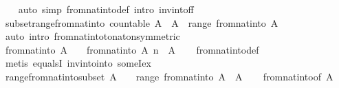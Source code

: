 \begin{isabellebody}
%
\isadelimproof
\ \ %
\endisadelimproof
%
\isatagproof
{}\isamarkupfalse%
\ {\isacharparenleft}auto\ simp{\isacharcolon}\ from{\isacharunderscore}nat{\isacharunderscore}into{\isacharunderscore}def\ intro{\isacharbang}{\isacharcolon}\ inv{\isacharunderscore}into{\isacharunderscore}f{\isacharunderscore}f{\isacharparenright}%
\endisatagproof
{\isafoldproof}%
%
\isadelimproof
\isanewline
%
\endisadelimproof
\isanewline
{}\isamarkupfalse%
\ subset{\isacharunderscore}range{\isacharunderscore}from{\isacharunderscore}nat{\isacharunderscore}into{\isacharcolon}\ {\isachardoublequoteopen}countable\ A\ {\isasymLongrightarrow}\ A\ {\isasymsubseteq}\ range\ {\isacharparenleft}from{\isacharunderscore}nat{\isacharunderscore}into\ A{\isacharparenright}{\isachardoublequoteclose}\isanewline
%
\isadelimproof
\ \ %
\endisadelimproof
%
\isatagproof
{}\isamarkupfalse%
\ {\isacharparenleft}auto\ intro{\isacharcolon}\ from{\isacharunderscore}nat{\isacharunderscore}into{\isacharunderscore}to{\isacharunderscore}nat{\isacharunderscore}on{\isacharbrackleft}symmetric{\isacharbrackright}{\isacharparenright}%
\endisatagproof
{\isafoldproof}%
%
\isadelimproof
\isanewline
%
\endisadelimproof
\isanewline
{}\isamarkupfalse%
\ from{\isacharunderscore}nat{\isacharunderscore}into{\isacharcolon}\ {\isachardoublequoteopen}A\ {\isasymnoteq}\ {\isacharbraceleft}{\isacharbraceright}\ {\isasymLongrightarrow}\ from{\isacharunderscore}nat{\isacharunderscore}into\ A\ n\ {\isasymin}\ A{\isachardoublequoteclose}\isanewline
%
\isadelimproof
\ \ %
\endisadelimproof
%
\isatagproof
{}\isamarkupfalse%
\ from{\isacharunderscore}nat{\isacharunderscore}into{\isacharunderscore}def\ \isamarkupfalse%
\ {\isacharparenleft}metis\ equals{}I\ inv{\isacharunderscore}into{\isacharunderscore}into\ someI{\isacharunderscore}ex{\isacharparenright}%
\endisatagproof
{\isafoldproof}%
%
\isadelimproof
\isanewline
%
\endisadelimproof
\isanewline
{}\isamarkupfalse%
\ range{\isacharunderscore}from{\isacharunderscore}nat{\isacharunderscore}into{\isacharunderscore}subset{\isacharcolon}\ {\isachardoublequoteopen}A\ {\isasymnoteq}\ {\isacharbraceleft}{\isacharbraceright}\ {\isasymLongrightarrow}\ range\ {\isacharparenleft}from{\isacharunderscore}nat{\isacharunderscore}into\ A{\isacharparenright}\ {\isasymsubseteq}\ A{\isachardoublequoteclose}\isanewline
%
\isadelimproof
\ \ %
\endisadelimproof
%
\isatagproof
{}\isamarkupfalse%
\ from{\isacharunderscore}nat{\isacharunderscore}into{\isacharbrackleft}of\ A{\isacharbrackright}\ \isamarkupfalse%

\end{isabellebody}
